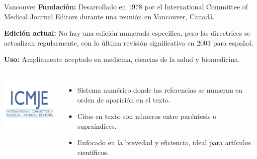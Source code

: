 \documentclass[
11pt, %
]{beamer}
\begin{document}
\begin{frame}{Vancouver}
	\textbf{Fundación:} Desarrollado en 1978 por el International Committee of Medical Journal Editors durante una reunión en Vancouver, Canadá.

	\textbf{Edición actual:} No hay una edición numerada específica, pero las directrices se actualizan regularmente, con la última revisión significativa en 2003 para español.

	\textbf{Uso:} Ampliamente aceptado en medicina, ciencias de la salud y biomedicina.

	\vspace{0.2cm}
	\begin{columns}[T]
		\centering
		\includegraphics[width=4cm]{logo icmje.jpeg} %
		\begin{itemize}
			\item Sistema numérico donde las referencias se numeran en orden de aparición en el texto.
			\item Citas en texto son números entre paréntesis o supraíndices.
			\item Enfocado en la brevedad y eficiencia, ideal para artículos científicos.
		\end{itemize}
	\end{columns}
\end{frame}
\end{document}
